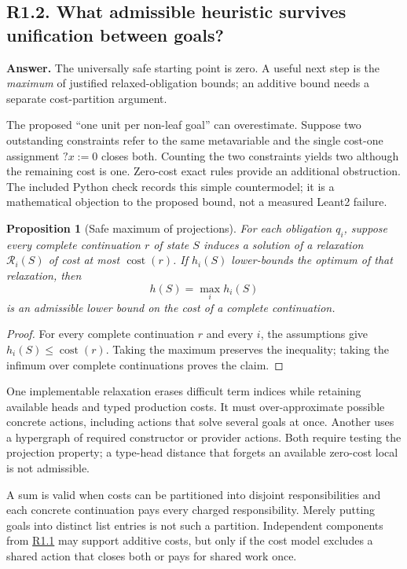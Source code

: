 \documentclass[11pt,a4paper]{article}
\newcommand{\question}[2]{\subsection{#1. #2}\label{q:#1}}
\newcommand{\qref}[1]{\hyperref[q:#1]{#1}}
\newcommand{\cost}{\operatorname{cost}}
\newtheorem{proposition}[theorem]{Proposition}
\theoremstyle{definition}
\theoremstyle{remark}
\begin{document}
\question{R1.2}{What admissible heuristic survives unification between goals?}

\textbf{Answer.} The universally safe starting point is zero. A useful next step is the \emph{maximum} of justified relaxed-obligation bounds; an additive bound needs a separate cost-partition argument.

The proposed ``one unit per non-leaf goal'' can overestimate. Suppose two outstanding constraints refer to the same metavariable and the single cost-one assignment $\mathord{?}x:=0$ closes both. Counting the two constraints yields two although the remaining cost is one. Zero-cost exact rules provide an additional obstruction. The included Python check records this simple countermodel; it is a mathematical objection to the proposed bound, not a measured Leant2 failure.

\begin{proposition}[Safe maximum of projections]\label{prop:maxbound}
For each obligation $q_i$, suppose every complete continuation $r$ of state $S$ induces a solution of a relaxation $\mathcal R_i(S)$ of cost at most $\cost(r)$. If $h_i(S)$ lower-bounds the optimum of that relaxation, then
\[
 h(S)=\max_i h_i(S)
\]
is an admissible lower bound on the cost of a complete continuation.
\end{proposition}
\begin{proof}
For every complete continuation $r$ and every $i$, the assumptions give $h_i(S)\leq\cost(r)$. Taking the maximum preserves the inequality; taking the infimum over complete continuations proves the claim.
\end{proof}

One implementable relaxation erases difficult term indices while retaining available heads and typed production costs. It must over-approximate possible concrete actions, including actions that solve several goals at once. Another uses a hypergraph of required constructor or provider actions. Both require testing the projection property; a type-head distance that forgets an available zero-cost local is not admissible.

A sum is valid when costs can be partitioned into disjoint responsibilities and each concrete continuation pays every charged responsibility. Merely putting goals into distinct list entries is not such a partition. Independent components from \qref{R1.1} may support additive costs, but only if the cost model excludes a shared action that closes both or pays for shared work once.
\end{document}
